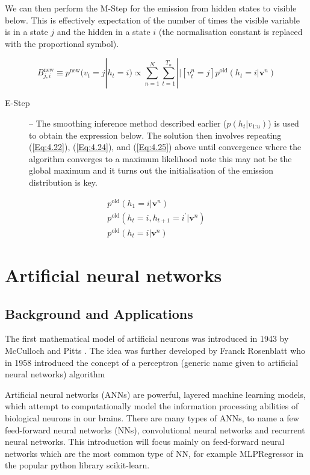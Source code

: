 We can then perform the M-Step for the emission from hidden states to visible below. This is effectively expectation of the number of times the visible variable is in a state $j$ and the hidden in a state $i$ (the normalisation constant is replaced with the proportional symbol).

\begin{equation}\label{Eq:4.25}
    B_{j,i}^{\text{new}} \equiv p^{\text{new}} ( v_t = j| h_t = i )
    \propto
    \sum_{n=1}^{N}
    \sum_{t=1}^{T_n}
    ||
    \left[v_t^n = j\right]
    p^{\text{old}} (h_t = i|\mathbf{v}^n)
\end{equation}

\begin{description}
    \item[E-Step] -- The smoothing inference method described earlier ($p(h_t|v_{1\text{:}u})$) is used to obtain the expression below. The solution then involves repeating (\ref{Eq:4.22}), (\ref{Eq:4.24}), and (\ref{Eq:4.25}) above until convergence where the algorithm converges to a maximum likelihood note this may not be the global maximum and it turns out the initialisation of the emission distribution is key.
\end{description}
\begin{gather}
    p^{\text{old}} ( h_1 = i|\mathbf{v}^n ) \\
    p^{\text{old}} ( h_t = i,h_{t+1} = i^\prime | \mathbf{v}^n ) \\
    p^{\text{old}} ( h_t = i|\mathbf{v}^n )
\end{gather}


\section{Artificial neural networks}

\subsection{Background and Applications}

The first mathematical model of artificial neurons was introduced in 1943 by McCulloch and Pitts \autocite{mcculloch1943logical}. The idea was further developed by Franck Rosenblatt who in 1958 introduced the concept of a perceptron (generic name given to artificial neural networks) algorithm \autocite{rosenblatt1958perceptron}

Artificial neural networks (ANNs) are powerful, layered machine learning models, which attempt to computationally model the information processing abilities of biological neurons in our brains. There are many types of ANNs, to name a few feed-forward neural networks (NNs), convolutional neural networks and recurrent neural networks. This introduction will focus mainly on feed-forward neural networks which are the most common type of NN, for example MLPRegressor in the popular python library scikit-learn.

